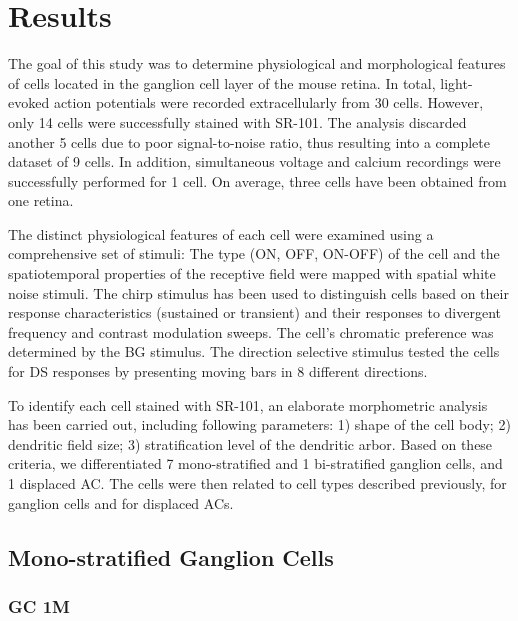 \chapter{Results}

The goal of this study was to determine physiological and morphological features of cells located in the ganglion cell layer of the mouse retina. In total, light-evoked action potentials were recorded extracellularly from 30 cells. However, only 14 cells were successfully stained with SR-101. The analysis discarded another 5 cells due to poor signal-to-noise ratio, thus resulting into a complete dataset of 9 cells. In addition, simultaneous voltage and calcium recordings were successfully performed for 1 cell. On average, three cells have been obtained from one retina. 

The distinct physiological features of each cell were examined using a comprehensive set of stimuli: The type (ON, OFF, ON-OFF) of the cell and the spatiotemporal properties of the receptive field were mapped with spatial white noise stimuli. The chirp stimulus has been used to distinguish cells based on their response characteristics (sustained or transient) and their responses to divergent frequency and contrast modulation sweeps. The cell’s chromatic preference was determined by the BG stimulus. The direction selective stimulus tested the cells for DS responses by presenting moving bars in 8 different directions. 

To identify each cell stained with SR-101, an elaborate morphometric analysis has been carried out, including following parameters: 1) shape of the cell body; 2) dendritic field size; 3) stratification level of the dendritic arbor. Based on these criteria, we differentiated 7 mono-stratified and 1 bi-stratified ganglion cells, and 1 displaced AC. The cells were then related to cell types described previously, \citep{badea04, coombs06, sun02, kong05, voelgyi09} for ganglion cells and \citep{sevilla07} for displaced ACs. 


\section{Mono-stratified Ganglion Cells}
\subsection{GC 1M} 

